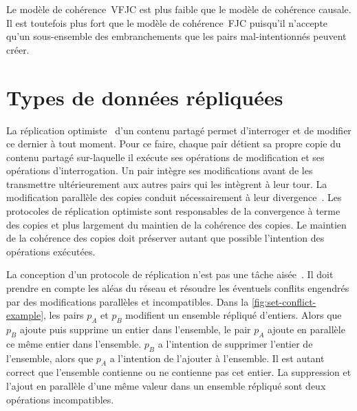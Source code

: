 Le modèle de cohérence~\ac{VFJC} est plus faible que le modèle de cohérence causale.
Il est toutefois plus fort que le modèle de cohérence~\ac{FJC} puisqu'il n'accepte qu'un sous-ensemble des embranchements que les pairs mal-intentionnés peuvent créer.




\clearpage %
\section{Types de données répliquées}\label{sec:crdt}

La réplication optimiste~\autocite{saito_2005_optimisticreplication} d'un contenu partagé permet d'interroger et de modifier ce dernier à tout moment.
Pour ce faire, chaque pair détient sa propre copie du contenu partagé sur-laquelle il exécute ses opérations de modification et ses opérations d'interrogation.
Un pair intègre ses modifications avant de les transmettre ultérieurement aux autres pairs qui les intègrent à leur tour.
La modification parallèle des copies conduit nécessairement à leur divergence~\autocite{dourish_1995_divergence}.
Les protocoles de réplication optimiste sont responsables de la convergence à terme des copies et plus largement du maintien de la cohérence des copies.
Le maintien de la cohérence des copies doit préserver autant que possible l'intention des opérations exécutées.

La conception d'un protocole de réplication n'est pas une tâche aisée~\autocite{oster2005_otisuues}.
Il doit prendre en compte les aléas du réseau \autocite{rotem_falalcies_2006} et résoudre les éventuels conflits engendrés par des modifications parallèles et incompatibles.
Dans la \autoref{fig:set-conflict-example}, les pairs $p_A$ et $p_B$ modifient un ensemble répliqué d'entiers.
Alors que $p_B$ ajoute puis supprime un entier dans l'ensemble, le pair $p_A$ ajoute en parallèle ce même entier dans l'ensemble.
$p_B$ a l'intention de supprimer l'entier de l'ensemble, alors que $p_A$ a l'intention de l'ajouter à l'ensemble.
Il est autant correct que l'ensemble contienne ou ne contienne pas cet entier.
La suppression et l'ajout en parallèle d'une même valeur dans un ensemble répliqué sont deux opérations incompatibles.


